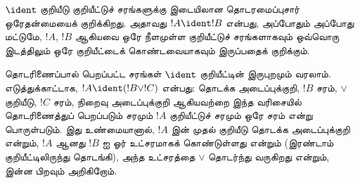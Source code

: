 \documentclass[../../../include/open-logic-section]{subfiles}
\begin{document}
\begin{defn}[தொடரமைப்புசார் ஒரேதன்மை]
$\ident$ குறியீடு குறியீட்டுச் சரங்களுக்கு இடையிலான தொடரமைப்புசார்
ஒரேதன்மையைக் குறிக்கிறது. அதாவது $!A \ident !B$ என்பது, அப்போதும்
அப்போது மட்டுமே, $!A$, $!B$ ஆகியவை ஒரே நீளமுள்ள குறியீட்டுச் சரங்களாகவும்
ஒவ்வொரு இடத்திலும் ஒரே குறியீட்டைக் கொண்டவையாகவும் இருப்பதைக் குறிக்கும்.
\end{defn}

தொடரிணைப்பால் பெறப்பட்ட சரங்கள் $\ident$ குறியீட்டின் இருபுறமும் வரலாம்.
எடுத்துக்காட்டாக, $!A \ident (!B \lor !C)$ என்பது: தொடக்க அடைப்புக்குறி,
$!B$ சரம், $\lor$ குறியீடு, $!C$ சரம், நிறைவு அடைப்புக்குறி ஆகியவற்றை
இந்த வரிசையில் தொடரிணைத்துப் பெறப்படும் சரமும் $!A$ குறியீட்டுச் சரமும்
ஒரே சரம் என்று பொருள்படும். இது உண்மையானால், $!A$ இன் முதல் குறியீடு
தொடக்க அடைப்புக்குறி என்றும், $!A$ ஆனது $!B$ ஐ ஓர் உட்சரமாகக்
கொண்டுள்ளது என்றும் (இரண்டாம் குறியீட்டிலிருந்து தொடங்கி), அந்த உட்சரத்தை
$\lor$ தொடர்ந்து வருகிறது என்றும், இன்ன பிறவும் அறிகிறோம்.
\end{document}
